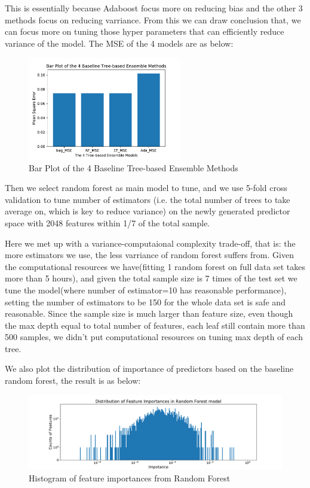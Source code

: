 \documentclass[11pt]{article}
\begin{document}
\begin{enumerate}
\begin{enumerate}
This is essentially because Adaboost focus more on reducing bias and the other 3 methods focus on reducing varriance. From this we can draw conclusion that, we can focus more on tuning those hyper parameters that can efficiently reduce variance of the model. The MSE of the 4 models are as below: 

\begin{figure}[h]
\centering
\includegraphics[width=0.6\textwidth]{MSE_ensemble}
\caption{Bar Plot of the 4 Baseline Tree-based Ensemble Methods}
\label{fig:MSE_ensemble}
\end{figure}



Then we select random forest as main model to tune, and we use 5-fold cross validation to tune number of estimators (i.e. the total number of trees to take average on, which is key to reduce variance) on the newly generated predictor space with 2048 features within 1/7 of the total sample. 

Here we met up with a variance-computaional complexity trade-off, that is: the more estimators we use, the less varriance of random forest suffers from. Given the computational resources we have(fitting 1 random forest on full data set takes more than 5 hours), and given the total sample size is 7 times of the test set we tune the model(where number of estimator=10 has reasonable performance), setting the number of estimators to be 150 for the whole data set is safe and reasonable. 
Since the sample size is much larger than feature size, even though the max depth equal to total number of features, each leaf still contain more than 500 samples, we didn't put computational resources on tuning max depth of each tree.

We also plot the distribution of importance of predictors based on the baseline random forest, the result is as below:

\begin{figure}[h]
\centering
\includegraphics[width=\textwidth]{his_feature_importance}
\caption{Histogram of feature importances from Random Forest}
\label{fig:his_feature_importance}
\end{figure}


\end{enumerate}
\end{enumerate}
\end{document}
